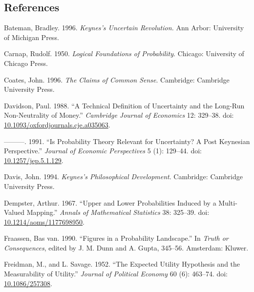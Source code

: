 \documentclass[
  11pt,
  letterpaper,
  DIV=11,
  numbers=noendperiod,
  twoside]{scrartcl}
\newlength{\cslhangindent}
\newenvironment{CSLReferences}[2] %
 {\begin{list}{}{%
  \setlength{\itemindent}{0pt}
  \setlength{\leftmargin}{0pt}
  \setlength{\parsep}{0pt}
  \ifodd #1
   \setlength{\leftmargin}{\cslhangindent}
   \setlength{\itemindent}{-1\cslhangindent}
  \fi
  \setlength{\itemsep}{#2\baselineskip}}}
 {\end{list}}
\begin{document}
\subsection*{References}\label{references}

\label{refs}
\begin{CSLReferences}{1}{0}
Bateman, Bradley. 1996. \emph{Keynes's Uncertain Revolution.} Ann Arbor:
University of Michigan Press.

Carnap, Rudolf. 1950. \emph{Logical Foundations of Probability}.
Chicago: University of Chicago Press.

Coates, John. 1996. \emph{The Claims of Common Sense}. Cambridge:
Cambridge University Press.

Davidson, Paul. 1988. {``A Technical Definition of Uncertainty and the
Long-Run Non-Neutrality of Money.''} \emph{Cambridge Journal of
Economics} 12: 329--38. doi:
\href{https://doi.org/10.1093/oxfordjournals.cje.a035063}{10.1093/oxfordjournals.cje.a035063}.

---------. 1991. {``Is Probability Theory Relevant for Uncertainty? A
Post Keynesian Perspective.''} \emph{Journal of Economic Perspectives} 5
(1): 129--44. doi:
\href{https://doi.org/10.1257/jep.5.1.129}{10.1257/jep.5.1.129}.

Davis, John. 1994. \emph{Keynes's Philosophical Development}. Cambridge:
Cambridge University Press.

Dempster, Arthur. 1967. {``Upper and Lower Probabilities Induced by a
Multi-Valued Mapping.''} \emph{Annals of Mathematical Statistics} 38:
325--39. doi:
\href{https://doi.org/10.1214/aoms/1177698950}{10.1214/aoms/1177698950}.

Fraassen, Bas van. 1990. {``Figures in a Probability Landscape.''} In
\emph{Truth or Consequences}, edited by J. M. Dunn and A. Gupta,
345--56. Amsterdam: Kluwer.

Freidman, M., and L. Savage. 1952. {``The Expected Utility Hypothesis
and the Measurability of Utility.''} \emph{Journal of Political Economy}
60 (6): 463--74. doi:
\href{https://doi.org/10.1086/257308}{10.1086/257308}.


\end{CSLReferences}
\end{document}
